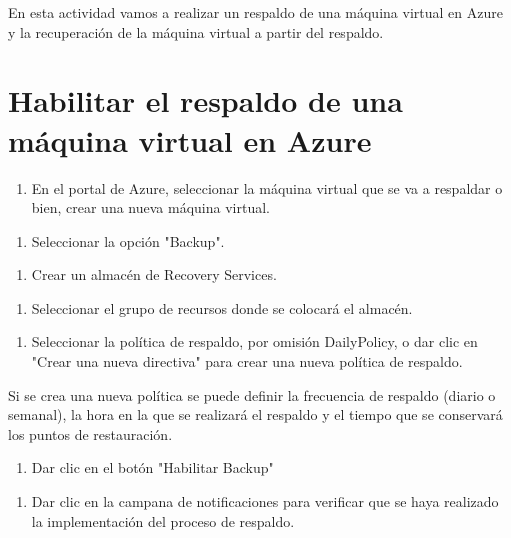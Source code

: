 En esta actividad vamos a realizar un respaldo de una máquina virtual en Azure y la recuperación de la máquina virtual a partir del respaldo.

\section{Habilitar el respaldo de una máquina virtual en Azure}

\begin{enumerate}
\item En el portal de Azure, seleccionar la máquina virtual que se va a respaldar o bien, crear una nueva máquina virtual.
\end{enumerate}

\begin{enumerate}
\item Seleccionar la opción "Backup".
\end{enumerate}

\begin{enumerate}
\item Crear un almacén de Recovery Services.
\end{enumerate}

\begin{enumerate}
\item Seleccionar el grupo de recursos donde se colocará el almacén.
\end{enumerate}

\begin{enumerate}
\item Seleccionar la política de respaldo, por omisión DailyPolicy, o dar clic en "Crear una nueva directiva" para crear una nueva política de respaldo.
\end{enumerate}

Si se crea una nueva política se puede definir la frecuencia de respaldo (diario o semanal), la hora en la que se realizará el respaldo y el tiempo que se conservará los puntos de restauración.

\begin{enumerate}
\item Dar clic en el botón "Habilitar Backup"
\end{enumerate}

\begin{enumerate}
\item Dar clic en la campana de notificaciones para verificar que se haya realizado la implementación del proceso de respaldo.
\end{enumerate}

